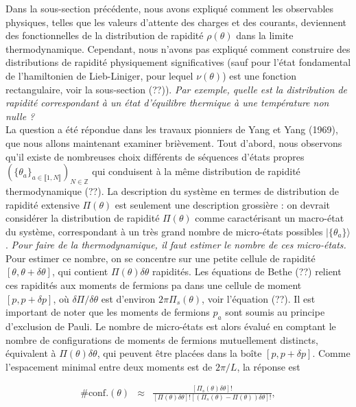 Dans la sous-section précédente, nous avons expliqué comment les observables physiques, telles que les valeurs d'attente des charges et des courants, deviennent des fonctionnelles de la distribution de rapidité $\rho(\theta)$ dans la limite thermodynamique. Cependant, nous n'avons pas expliqué comment construire des distributions de rapidité physiquement significatives (sauf pour l'état fondamental de l'hamiltonien de Lieb-Liniger, pour lequel $\nu(\theta)$) est une fonction rectangulaire, voir la sous-section (??)). {\em Par exemple, quelle est la distribution de rapidité correspondant à un état d'équilibre thermique à une température non nulle ?}\\
	
	La question a été répondue dans les travaux pionniers de Yang et Yang (1969), que nous allons maintenant examiner brièvement. Tout d'abord, nous observons qu'il existe de nombreuses choix différents de séquences d'états propres $(\{\theta_a\}_{ a \in \llbracket 1 , N \rrbracket} )_{ N \in \mathbb{Z}}$ qui conduisent à la même distribution de rapidité thermodynamique (??). La description du système en termes de distribution de rapidité extensive $\Pi( \theta ) $ est seulement une description grossière : on devrait considérer la distribution de rapidité $\Pi ( \theta ) $ comme caractérisant un macro-état du système, correspondant à un très grand nombre de micro-états possibles $\vert \{ \theta_a \} \rangle $. {\em Pour faire de la thermodynamique, il faut estimer le nombre de ces micro-états.}\\
	
	Pour estimer ce nombre, on se concentre sur une petite cellule de rapidité $[\theta, \theta+\delta\theta]$, qui contient $\Pi(\theta) \delta \theta$ rapidités. Les équations de Bethe (??) relient ces rapidités aux moments de fermions pa dans une cellule de moment $[p, p+\delta p]$, où $\delta \Pi/\delta \theta$ est d'environ $2\pi \Pi_s(\theta)$, voir l'équation (??). Il est important de noter que les moments de fermions $p_a$ sont soumis au principe d'exclusion de Pauli. Le nombre de micro-états est alors évalué en comptant le nombre de configurations de moments de fermions mutuellement distincts, équivalent à $\Pi (\theta)\delta \theta$, qui peuvent être placées dans la boîte $[p, p + \delta p]$. Comme l'espacement minimal entre deux moments est de $2\pi /L$, la réponse est
	
	
	\begin{eqnarray}
		\# \mbox{conf.}(\theta) & \approx  & \frac{[ \Pi_s ( \theta ) \delta \theta ] ! }{ [ \Pi ( \theta ) \delta \theta ] ! [( \Pi_s ( \theta ) - \Pi ( \theta ) )  \delta \theta ] ! } , 	
	\end{eqnarray}
	
